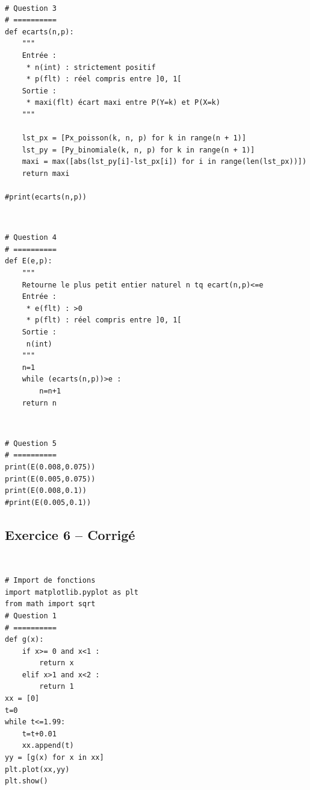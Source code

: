 \documentclass[10pt,fleqn]{article} %
\begin{document}
\begin{corrige}
$\quad$
\begin{lstlisting}
# Question 3
# ==========
def ecarts(n,p):
	"""
	Entrée :
     * n(int) : strictement positif
     * p(flt) : réel compris entre ]0, 1[
    Sortie : 
     * maxi(flt) écart maxi entre P(Y=k) et P(X=k)
    """
     
	lst_px = [Px_poisson(k, n, p) for k in range(n + 1)]
    lst_py = [Py_binomiale(k, n, p) for k in range(n + 1)]
    maxi = max([abs(lst_py[i]-lst_px[i]) for i in range(len(lst_px))])
    return maxi
    
#print(ecarts(n,p))
\end{lstlisting}
\end{corrige}

\begin{corrige}
$\quad$
\begin{lstlisting}
# Question 4
# ==========
def E(e,p):
	"""
	Retourne le plus petit entier naturel n tq ecart(n,p)<=e
	Entrée : 
	 * e(flt) : >0
	 * p(flt) : réel compris entre ]0, 1[
    Sortie :
     n(int)
	"""
	n=1
	while (ecarts(n,p))>e :
		n=n+1
	return n
\end{lstlisting}
\end{corrige}

\begin{corrige}
$\quad$
\begin{lstlisting}
# Question 5
# ==========
print(E(0.008,0.075))
print(E(0.005,0.075))
print(E(0.008,0.1))
#print(E(0.005,0.1))
\end{lstlisting}
\end{corrige}




\subsection*{Exercice 6 -- Corrigé}
\begin{corrige}
$\quad$
\begin{lstlisting}
# Import de fonctions
import matplotlib.pyplot as plt
from math import sqrt
# Question 1 
# ==========
def g(x):
    if x>= 0 and x<1 :
        return x
    elif x>1 and x<2 :
        return 1
xx = [0]
t=0
while t<=1.99:
    t=t+0.01
    xx.append(t)
yy = [g(x) for x in xx]
plt.plot(xx,yy)
plt.show()
\end{lstlisting}
\end{corrige}
\end{document}

